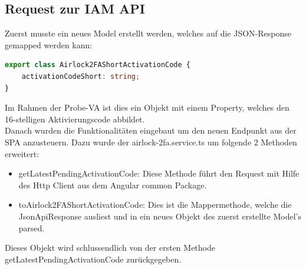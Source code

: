 \subsection{Request zur IAM API}
Zuerst musste ein neues Model erstellt werden, welches auf die JSON-Response gemapped werden kann:
\begin{lstlisting}[language=TypeScript]
export class Airlock2FAShortActivationCode {
	activationCodeShort: string;
}
\end{lstlisting}
Im Rahmen der Probe-VA ist dies ein Objekt mit einem Property, welches den 16-stelligen Aktivierungscode abbildet. \\
Danach wurden die Funktionalitäten eingebaut um den neuen Endpunkt aus der SPA anzusteuern. Dazu wurde der \flqq airlock-2fa.service.ts\frqq{} um folgende 2 Methoden erweitert:
\begin{itemize}
	\item getLatestPendingActivationCode: Diese Methode führt den Request mit Hilfe des Http Client aus dem Angular common Package. 
	\item toAirlock2FAShortActivationCode: Dies ist die Mappermethode, welche die JsonApiResponse ausliest und in ein neues Objekt des zuerst erstellte Model's parsed. 
\end{itemize}
Dieses Objekt wird schlussendlich von der ersten Methode \flqq getLatestPendingActivationCode\frqq{} zurückgegeben.

